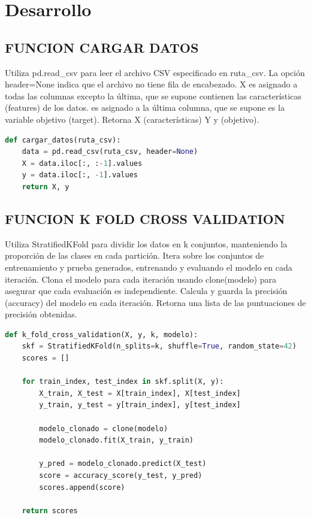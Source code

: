 \documentclass[12pt]{article}
\begin{document}
\section*{Desarrollo}

\subsection*{FUNCION CARGAR DATOS}

Utiliza pd.read\_csv para leer el archivo CSV especificado en ruta\_csv. La opción header=None indica que el archivo no tiene fila de encabezado. X es asignado a todas las columnas excepto la última, que se supone contienen las características (features) de los datos. es asignado a la última columna, que se supone es la variable objetivo (target). Retorna X (características) Y y (objetivo).\vspace{1cm}

\begin{lstlisting}[language=Python]
def cargar_datos(ruta_csv):
	data = pd.read_csv(ruta_csv, header=None)
	X = data.iloc[:, :-1].values
	y = data.iloc[:, -1].values
	return X, y
\end{lstlisting}


\subsection*{FUNCION K FOLD CROSS VALIDATION}

Utiliza StratifiedKFold para dividir los datos en k conjuntos, manteniendo la proporción de las clases en cada partición. Itera sobre los conjuntos de entrenamiento y prueba generados, entrenando y evaluando el modelo en cada iteración. Clona el modelo para cada iteración usando clone(modelo) para asegurar que cada evaluación es independiente. Calcula y guarda la precisión (accuracy) del modelo en cada iteración. Retorna una lista de las puntuaciones de precisión obtenidas. \vspace{1cm}

\begin{lstlisting}[language=Python]
def k_fold_cross_validation(X, y, k, modelo):
	skf = StratifiedKFold(n_splits=k, shuffle=True, random_state=42)
	scores = []
	
	for train_index, test_index in skf.split(X, y):
		X_train, X_test = X[train_index], X[test_index]
		y_train, y_test = y[train_index], y[test_index]
		
		modelo_clonado = clone(modelo)
		modelo_clonado.fit(X_train, y_train)
		
		y_pred = modelo_clonado.predict(X_test)
		score = accuracy_score(y_test, y_pred)
		scores.append(score)
	
	return scores
\end{lstlisting}
\end{document}
